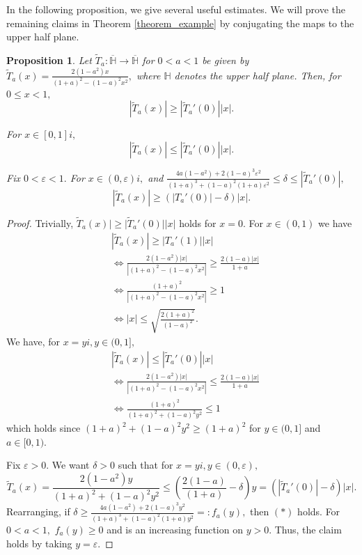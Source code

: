 \documentclass[12pt,reqno]{amsart}
\numberwithin{theorem}{section}
\newtheorem{proposition}[theorem]{Proposition}%
\begin{document}
In the following proposition, we give several useful estimates. We will prove the remaining claims in Theorem \ref{theorem_example} by conjugating the maps to the upper half plane.
\begin{proposition}\label{plane_bounds}
    Let $\tilde{T}_{a}:\overline{\mathbb{H}}\to\overline{\mathbb{H}}$ for $0<a<1$ be given by $\tilde{T}_a(x)=\frac{2(1-a^2)x}{(1+a)^2-(1-a)^2x^2},$ where $\mathbb{H}$ denotes the upper half plane. Then, for $0\le x<1,$ $$|\tilde{T}_a(x)|\ge|\tilde{T}_a'(0)||x|.$$ 
    
    For $x\in[0,1]i,$ $$|\tilde{T}_a(x)|\le|\tilde{T}_a'(0)||x|.$$ 
    
    Fix $0<\varepsilon<1.$ For $x\in (0,\varepsilon)i,$ and $\frac{4a(1-a^2)+2(1-a)^3\varepsilon^2}{(1+a)^3+(1-a)^2(1+a)\varepsilon^2}\le\delta\le|\tilde{T}_{a}'(0)|,$ $$|\tilde{T}_{a}(x)|\ge\left(|T_{a}'(0)|-\delta\right)|x|.$$
\end{proposition}
\begin{proof}
    Trivially, $\tilde{T}_a(x)|\ge|\tilde{T}_a'(0)||x|$ holds for $x=0.$ For $x\in(0,1)$ we have
    \begin{align*}
        &|\tilde{T}_{a}(x)|\ge|T_{a}'(1)||x|\\&\iff\frac{2(1-a^2)|x|}{|(1+a)^2-(1-a)^2x^2|}\ge\frac{2(1-a)|x|}{1+a}\\&\iff \frac{(1+a)^2}{|(1+a)^2-(1-a)^2x^2|}\ge1\\&\iff|x|\le\sqrt{\frac{2(1+a)^2}{(1-a)^2}}.
    \end{align*} We have, for $x=yi, y\in(0,1],$ \begin{align*}
       &|\tilde{T}_a(x)|\le|\tilde{T}_{a}'(0)||x|\\&\iff \frac{2(1-a^2)|x|}{|(1+a)^2-(1-a)^2x^2|}\le \frac{2(1-a)|x|}{1+a}\\&\iff\frac{(1+a)^2}{(1+a)^2+(1-a)^2y^2}\le1
   \end{align*} which holds since $(1+a)^2+(1-a)^2y^2\ge(1+a)^2$ for $y\in(0,1]$ and $a\in[0,1).$ 
   
   Fix $\varepsilon>0.$ We want $\delta>0$ such that for $x=yi, y\in(0, \varepsilon),$ 
   \begin{equation*}
   \tilde{T}_a(x)=\frac{2(1-a^2)y}{(1+a)^2+(1-a)^2y^2}\le\left(\frac{2(1-a)}{(1+a)}-\delta\right)y=(|\tilde{T}_{a}'(0)|-\delta)|x| \tag{$*$}\label{eq_ast}.
   \end{equation*}
   Rearranging, if $\delta\ge\frac{4a(1-a^2)+2(1-a)^3y^2}{(1+a)^3+(1-a)^2(1+a)y^2}=:f_{a}(y),$ then $(*)$ holds. For $0<a<1,$ $f_a(y)\ge0$ and is an increasing function on $y>0.$ Thus, the claim holds by taking $y=\varepsilon.$
\end{proof}
\end{document}
